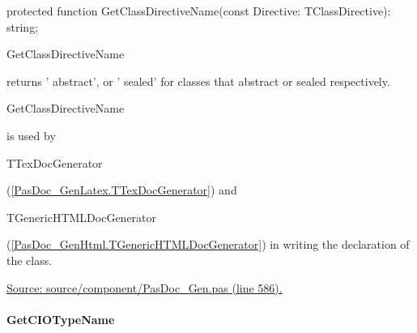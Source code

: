 \documentclass{report}
\newif\ifpdf
\begin{document}
\label{PasDoc_Gen.TDocGenerator-GetClassDirectiveName}
\begin{list}{}{
\setlength{\itemindent}{0cm}
\setlength{\listparindent}{0cm}
\setlength{\leftmargin}{\evensidemargin}
\addtolength{\leftmargin}{\tmplength}
\settowidth{\labelsep}{X}
\addtolength{\leftmargin}{\labelsep}
\setlength{\labelwidth}{\tmplength}
}
\item[\textbf{Declaration}\hfill]
\ifpdf
\begin{flushleft}
\fi
\begin{ttfamily}
protected function GetClassDirectiveName(const Directive: TClassDirective): string;\end{ttfamily}

\ifpdf
\end{flushleft}
\fi

\par
\item[\textbf{Description}]
\begin{ttfamily}GetClassDirectiveName\end{ttfamily} returns ' abstract', or ' sealed' for classes that abstract or sealed respectively. \begin{ttfamily}GetClassDirectiveName\end{ttfamily} is used by \begin{ttfamily}TTexDocGenerator\end{ttfamily}(\ref{PasDoc_GenLatex.TTexDocGenerator}) and \begin{ttfamily}TGenericHTMLDocGenerator\end{ttfamily}(\ref{PasDoc_GenHtml.TGenericHTMLDocGenerator}) in writing the declaration of the class.\par
\href{https://github.com/pasdoc/pasdoc/blob/master/source/component/PasDoc_Gen.pas#L586}{Source: source/component/PasDoc{\_}Gen.pas (line 586).}

\end{list}
\paragraph*{GetCIOTypeName}\hspace*{\fill}
\end{document}

